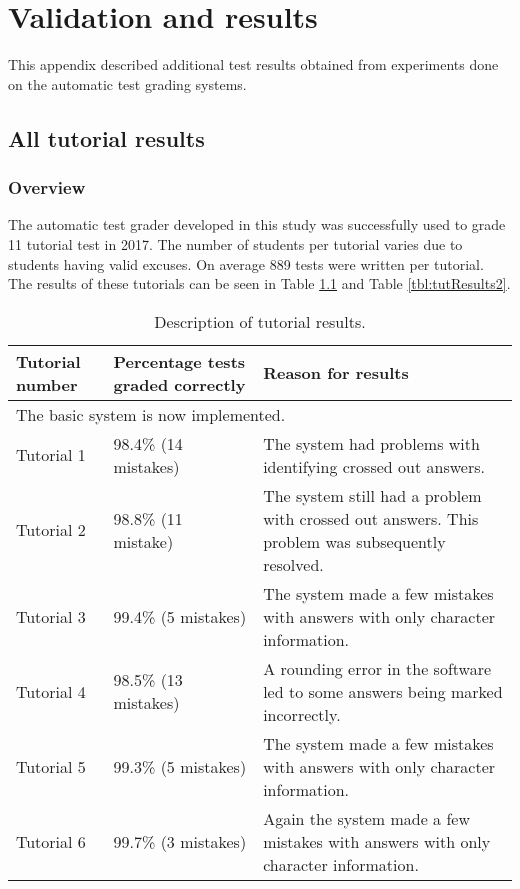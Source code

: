 \chapter{Validation and results}
\label{ap:results}
\graphicspath{{Appendix5/Appendix5figures/}}

This appendix described additional test results obtained from experiments done on the automatic test grading systems.

\section{All tutorial results}
\label{sec:tutorialResults}

\subsection{Overview}

The automatic test grader developed in this study was successfully used to grade 11 tutorial test in 2017. The number of students per tutorial varies due to students having valid excuses. On average 889 tests were written per tutorial. The results of these tutorials can be seen in Table \ref{tbl:tutResults} and Table \ref{tbl:tutResults2}.

\begin{table}
\caption{Description of tutorial results.} \label{tbl:tutResults}
  \centering
\begin{tabular}{|p{2cm}|p{4cm}|p{5cm}|}
\hline
\textbf{Tutorial number}&\textbf{Percentage tests graded correctly}&\textbf{Reason for results}\\
\hline
\multicolumn{3}{|l|}{The basic system is now implemented.}\\
\hline
Tutorial 1&98.4\% (14 mistakes)&The system had problems with identifying crossed out answers.\\
\hline
Tutorial 2&98.8\% (11 mistake)&The system still had a problem with crossed out answers.  This problem was subsequently resolved.\\
\hline
Tutorial 3&99.4\% (5 mistakes)&The system made a few mistakes with answers with only character information.\\
\hline
Tutorial 4&98.5\% (13 mistakes)&A rounding error in the software led to some answers being marked incorrectly.\\
\hline
Tutorial 5&99.3\% (5 mistakes)&The system made a few mistakes with answers with only character information.\\
\hline
Tutorial 6&99.7\% (3 mistakes)&Again the system made a few mistakes with answers with only character information.\\
\hline
\end{tabular} 
\end{table}

